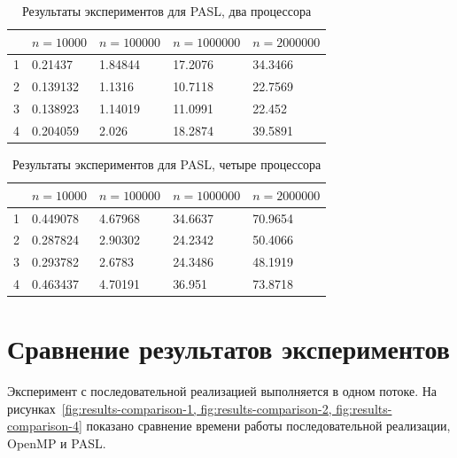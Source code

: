 \documentclass[specification,annotation]{itmo-student-thesis}
\begin{document}
\begin{table}[!ht]
\centering
\begin{tabular}{|l|l|l|l|l|}\hline
 & $n=10000$ & $n=100000$ & $n=1000000$ & $n=2000000$ \\\hline
1 & 0.21437 & 1.84844 & 17.2076 & 34.3466 \\\hline
2 & 0.139132 & 1.1316 & 10.7118 & 22.7569 \\\hline
3 & 0.138923 & 1.14019 & 11.0991 & 22.452 \\\hline
4 & 0.204059 & 2.026 & 18.2874 & 39.5891 \\\hline
\end{tabular}
\caption{Результаты экспериментов для PASL, два процессора}\label{tbl:results-pasl-2}
\end{table}

\begin{table}[!ht]
\centering
\begin{tabular}{|l|l|l|l|l|}\hline
 & $n=10000$ & $n=100000$ & $n=1000000$ & $n=2000000$ \\\hline
1 & 0.449078 & 4.67968 & 34.6637 & 70.9654 \\\hline
2 & 0.287824 & 2.90302 & 24.2342 & 50.4066 \\\hline
3 & 0.293782 & 2.6783 & 24.3486 & 48.1919 \\\hline
4 & 0.463437 & 4.70191 & 36.951 & 73.8718 \\\hline
\end{tabular}
\caption{Результаты экспериментов для PASL, четыре процессора}\label{tbl:results-pasl-4}
\end{table}

\section{Сравнение результатов экспериментов}

Эксперимент с последовательной реализацией выполняется в одном потоке. На рисунках~\ref{fig:results-comparison-1, fig:results-comparison-2, fig:results-comparison-4} показано сравнение времени работы последовательной реализации, OpenMP и PASL. 
\end{document}
